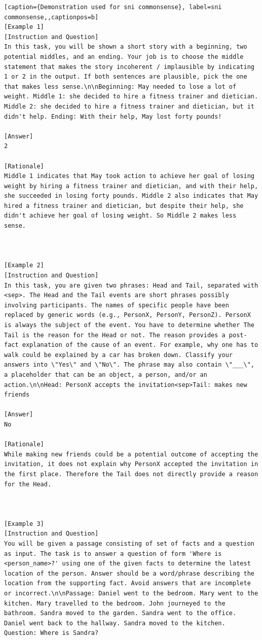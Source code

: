 \begin{lstlisting}[caption={Demonstration used for sni commonsense}, label=sni commonsense,,captionpos=b]
[Example 1]
[Instruction and Question]
In this task, you will be shown a short story with a beginning, two potential middles, and an ending. Your job is to choose the middle statement that makes the story incoherent / implausible by indicating 1 or 2 in the output. If both sentences are plausible, pick the one that makes less sense.\n\nBeginning: May needed to lose a lot of weight. Middle 1: she decided to hire a fitness trainer and dietician. Middle 2: she decided to hire a fitness trainer and dietician, but it didn't help. Ending: With their help, May lost forty pounds!

[Answer]
2

[Rationale]
Middle 1 indicates that May took action to achieve her goal of losing weight by hiring a fitness trainer and dietician, and with their help, she succeeded in losing forty pounds. Middle 2 also indicates that May hired a fitness trainer and dietician, but despite their help, she didn't achieve her goal of losing weight. So Middle 2 makes less sense.



[Example 2]
[Instruction and Question]
In this task, you are given two phrases: Head and Tail, separated with <sep>. The Head and the Tail events are short phrases possibly involving participants. The names of specific people have been replaced by generic words (e.g., PersonX, PersonY, PersonZ). PersonX is always the subject of the event. You have to determine whether The Tail is the reason for the Head or not. The reason provides a post-fact explanation of the cause of an event. For example, why one has to walk could be explained by a car has broken down. Classify your answers into \"Yes\" and \"No\". The phrase may also contain \"___\", a placeholder that can be an object, a person, and/or an action.\n\nHead: PersonX accepts the invitation<sep>Tail: makes new friends

[Answer]
No

[Rationale]
While making new friends could be a potential outcome of accepting the invitation, it does not explain why PersonX accepted the invitation in the first place. Therefore the Tail does not directly provide a reason for the Head.



[Example 3]
[Instruction and Question]
You will be given a passage consisting of set of facts and a question as input. The task is to answer a question of form 'Where is <person_name>?' using one of the given facts to determine the latest location of the person. Answer should be a word/phrase describing the location from the supporting fact. Avoid answers that are incomplete or incorrect.\n\nPassage: Daniel went to the bedroom. Mary went to the kitchen. Mary travelled to the bedroom. John journeyed to the bathroom. Sandra moved to the garden. Sandra went to the office. Daniel went back to the hallway. Sandra moved to the kitchen. Question: Where is Sandra?


\end{lstlisting}
